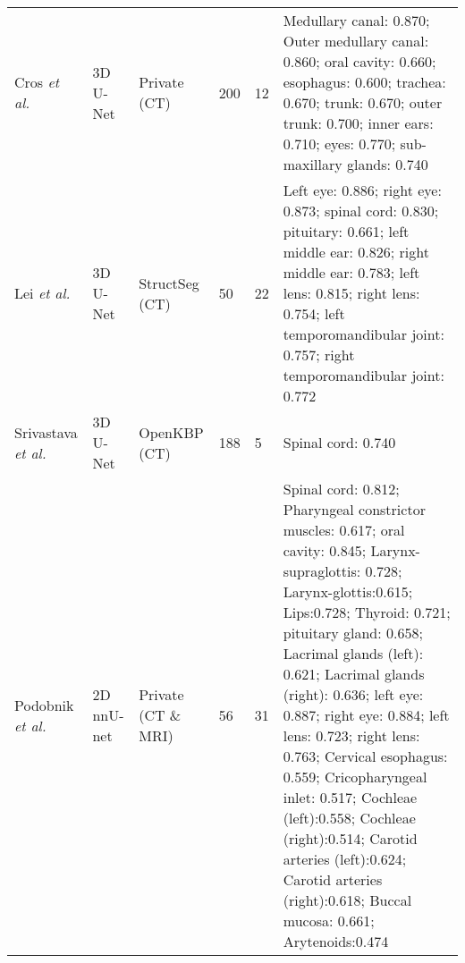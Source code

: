 \documentclass[lettersize,journal]{IEEEtran}
\begin{document}
{\begin{table*}[ht!]
{\begin{tabular}{@{}lllllm{}@{}}
Cros {\it{et al.}} \cite{46}        & 3D U-Net                  & Private (CT)              & 200                       & 12                          & Medullary canal: 0.870; Outer medullary canal: 0.860; oral cavity: 0.660; esophagus: 0.600; trachea: 0.670; trunk: 0.670; outer trunk: 0.700; inner ears: 0.710; eyes: 0.770; sub-maxillary glands: 0.740                                                                                                                                                                                                                                                                                                                                 \\
Lei {\it{et al.}} \cite{47}         & 3D U-Net                  & StructSeg (CT)            & 50                        & 22                          & Left eye: 0.886; right eye: 0.873; spinal cord: 0.830; pituitary: 0.661; left middle ear: 0.826; right middle ear: 0.783; left lens: 0.815; right lens: 0.754; left temporomandibular joint: 0.757; right temporomandibular joint: 0.772                                                                                                                                                                                                                                                                                                  \\
Srivastava {\it{et al.}} \cite{49}  & 3D U-Net                  & OpenKBP (CT) \cite{36}     & 188                       & 5                           & Spinal cord: 0.740                                                                                                                                                                                                                                                                                                                                                                                                                                                                                                                        \\
Podobnik {\it{et al.}} \cite{50}    & 2D nnU-net                & Private (CT \& MRI)         & 56                        & 31                          & Spinal cord: 0.812; Pharyngeal constrictor muscles: 0.617; oral cavity: 0.845; Larynx-supraglottis: 0.728; Larynx-glottis:0.615; Lips:0.728; Thyroid: 0.721; pituitary gland: 0.658; Lacrimal glands (left): 0.621; Lacrimal glands (right): 0.636; left eye: 0.887; right eye: 0.884; left lens: 0.723; right lens: 0.763; Cervical esophagus: 0.559; Cricopharyngeal inlet: 0.517; Cochleae (left):0.558; Cochleae (right):0.514; Carotid arteries (left):0.624; Carotid arteries (right):0.618; Buccal mucosa: 0.661; Arytenoids:0.474 \\

\end{tabular}}
\end{table*}}
\end{document}
